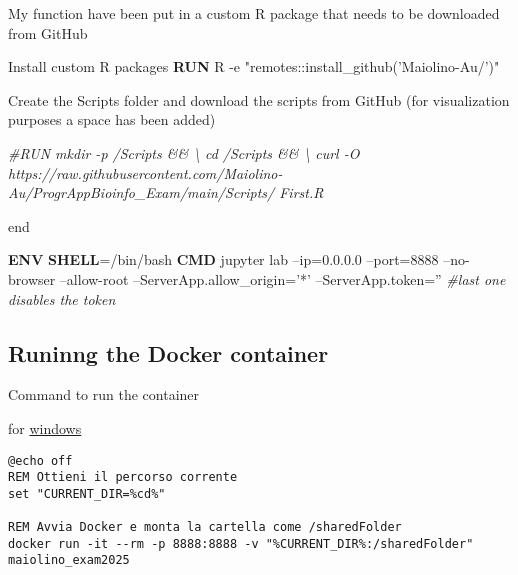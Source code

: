 \documentclass[]{article}
\newenvironment{Shaded}{\begin{snugshade}}{\end{snugshade}}
\newcommand{\CommentTok}[1]{\textcolor[rgb]{0.56,0.35,0.01}{\textit{#1}}}
\newcommand{\KeywordTok}[1]{\textcolor[rgb]{0.13,0.29,0.53}{\textbf{#1}}}
\newcommand{\NormalTok}[1]{#1}
\newcommand{\StringTok}[1]{\textcolor[rgb]{0.31,0.60,0.02}{#1}}
\begin{document}
My function have been put in a custom R package that needs to be
downloaded from GitHub

\begin{Shaded}
\begin{Highlighting}[]
\NormalTok{Install custom R packages}
\KeywordTok{RUN}\NormalTok{ R -e }\StringTok{"remotes::install_github('Maiolino-Au/')"}
\end{Highlighting}
\end{Shaded}

Create the Scripts folder and download the scripts from GitHub (for
visualization purposes a space has been added)

\begin{Shaded}
\begin{Highlighting}[]
\CommentTok{#RUN mkdir -p /Scripts && \textbackslash{}}
\CommentTok{  cd /Scripts && \textbackslash{}}
\CommentTok{  curl -O https://raw.githubusercontent.com/Maiolino-Au/ProgrAppBioinfo_Exam/main/Scripts/ First.R }
\end{Highlighting}
\end{Shaded}

end

\begin{Shaded}
\begin{Highlighting}[]
\KeywordTok{ENV} \KeywordTok{SHELL}\NormalTok{=/bin/bash}
\KeywordTok{CMD}\NormalTok{ jupyter lab --ip=0.0.0.0 --port=8888 --no-browser --allow-root --ServerApp.allow_origin=}\StringTok{'*'}\NormalTok{ --ServerApp.token=}\StringTok{''} \CommentTok{#last one disables the token}
\end{Highlighting}
\end{Shaded}

\hypertarget{runinng-the-docker-container}{%
\subsection{Runinng the Docker
container}\label{runinng-the-docker-container}}

Command to run the container

for
\href{https://github.com/Maiolino-Au/ProgrAppBioinfo_Exam/blob/main/Docker_container/script_windows_maiolino_exam2025.cmd}{windows}

\begin{verbatim}
@echo off
REM Ottieni il percorso corrente
set "CURRENT_DIR=%cd%"

REM Avvia Docker e monta la cartella come /sharedFolder
docker run -it --rm -p 8888:8888 -v "%CURRENT_DIR%:/sharedFolder" maiolino_exam2025
\end{verbatim}
\end{document}
